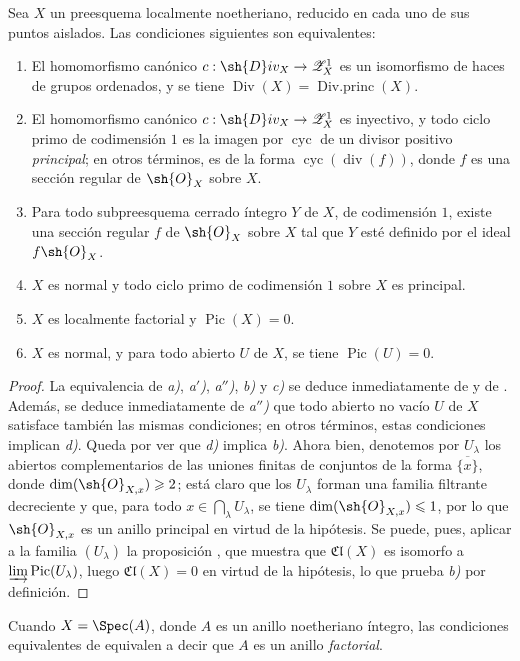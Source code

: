 \begin{corollary}[21.7.6]
\label{IV.21.7.6}
Sea $X$ un preesquema localmente noetheriano, reducido en cada uno de sus puntos aislados.
Las condiciones siguientes son equivalentes:
\begin{enumerate}
  \item[\emph{a)}] El homomorfismo canónico $c:\sh{D}iv_X\to\mathscr{Z}_X^1$ es un isomorfismo de haces de grupos ordenados, y se tiene $\operatorname{Div}(X)=\operatorname{Div.princ}(X)$.
  \item[\emph{a$'$)}] El homomorfismo canónico $c:\sh{D}iv_X\to\mathscr{Z}_X^1$ es inyectivo, y todo ciclo primo de codimensión $1$ es la imagen por $\operatorname{cyc}$ de un divisor positivo \emph{principal}; en otros términos, es de la forma $\operatorname{cyc}(\operatorname{div}(f))$, donde $f$ es una sección regular de $\sh{O}_X$ sobre $X$.
  \item[\emph{a$''$)}] Para todo subpreesquema cerrado íntegro $Y$ de $X$, de codimensión $1$, existe una sección regular $f$ de $\sh{O}_X$ sobre $X$ tal que $Y$ esté definido por el ideal $f\sh{O}_X$.
  \item[\emph{b)}] $X$ es normal y todo ciclo primo de codimensión $1$ sobre $X$ es principal.
  \item[\emph{c)}] $X$ es localmente factorial y $\operatorname{Pic}(X)=0$.
  \item[\emph{d)}] $X$ es normal, y para todo abierto $U$ de $X$, se tiene $\operatorname{Pic}(U)=0$.
\end{enumerate}
\end{corollary}

\begin{proof}
La equivalencia de \emph{a)}, \emph{a$'$)}, \emph{a$''$)}, \emph{b)} y \emph{c)} se deduce inmediatamente de  y de .
Además, se deduce inmediatamente de \emph{a$''$)} que todo abierto no vacío $U$ de $X$ satisface también las mismas condiciones; en otros términos, estas condiciones implican \emph{d)}.
Queda por ver que \emph{d)} implica \emph{b)}.
Ahora bien, denotemos por $U_\lambda$ los abiertos complementarios de las uniones finitas de conjuntos de la forma $\overline{\{x\}}$, donde $\dim(\sh{O}_{X,x})\geq2$;
está claro que los $U_\lambda$ forman una familia filtrante decreciente y que, para todo $x\in\bigcap_\lambda U_\lambda$, se tiene $\dim(\sh{O}_{X,x})\leq1$, por lo que $\sh{O}_{X,x}$ es un anillo principal en virtud de la hipótesis.
Se puede, pues, aplicar a la familia $(U_\lambda)$ la proposición , que muestra que $\mathfrak{Cl}(X)$ es isomorfo a $\varinjlim\operatorname{Pic}(U_\lambda)$, luego $\mathfrak{Cl}(X)=0$ en virtud de la hipótesis, lo que prueba \emph{b)} por definición.
\end{proof}

\begin{remark}[21.7.7]
\label{IV.21.7.7}
Cuando $X=\Spec(A)$, donde $A$ es un anillo noetheriano íntegro, las condiciones equivalentes de  equivalen a decir que $A$ es un anillo \emph{factorial}.
\end{remark}
